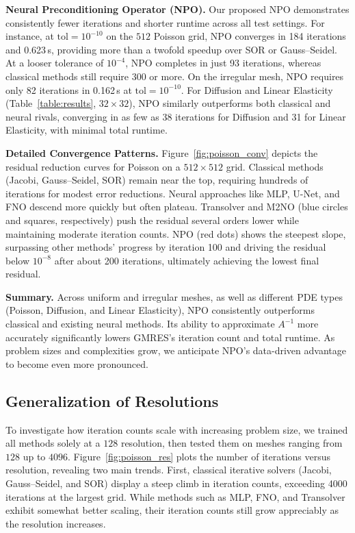 \textbf{Neural Preconditioning Operator (NPO).}
Our proposed NPO demonstrates consistently fewer iterations and shorter runtime across all test settings. For instance, at \(\mathrm{tol}=10^{-10}\) on the \(512\) Poisson grid, NPO converges in 184 iterations and 0.623\,s, providing more than a twofold speedup over SOR or Gauss--Seidel. At a looser tolerance of \(10^{-4}\), NPO completes in just 93 iterations, whereas classical methods still require 300 or more. On the irregular mesh, NPO requires only 82 iterations in 0.162\,s at \(\mathrm{tol}=10^{-10}\). For Diffusion and Linear Elasticity (Table~\ref{table:results}, \(32\times32\)), NPO similarly outperforms both classical and neural rivals, converging in as few as 38 iterations for Diffusion and 31 for Linear Elasticity, with minimal total runtime.





\textbf{Detailed Convergence Patterns.}
Figure~\ref{fig:poisson_conv} depicts the residual reduction curves for Poisson on a \(512\times512\) grid. Classical methods (Jacobi, Gauss--Seidel, SOR) remain near the top, requiring hundreds of iterations for modest error reductions. Neural approaches like MLP, U-Net, and FNO descend more quickly but often plateau. Transolver and M2NO (blue circles and squares, respectively) push the residual several orders lower while maintaining moderate iteration counts. NPO (red dots) shows the steepest slope, surpassing other methods’ progress by iteration 100 and driving the residual below \(10^{-8}\) after about 200 iterations, ultimately achieving the lowest final residual.

\textbf{Summary.}
Across uniform and irregular meshes, as well as different PDE types (Poisson, Diffusion, and Linear Elasticity), NPO consistently outperforms classical and existing neural methods. Its ability to approximate \(A^{-1}\) more accurately significantly lowers GMRES’s iteration count and total runtime. As problem sizes and complexities grow, we anticipate NPO’s data-driven advantage to become even more pronounced.


\subsection{Generalization of Resolutions}

To investigate how iteration counts scale with increasing problem size, we trained all methods solely at a $128$ resolution, then tested them on meshes ranging from \(128\) up to \(4096\). Figure~\ref{fig:poisson_res} plots the number of iterations versus resolution, revealing two main trends. First, classical iterative solvers (Jacobi, Gauss--Seidel, and SOR) display a steep climb in iteration counts, exceeding 4000 iterations at the largest grid. While methods such as MLP, FNO, and Transolver exhibit somewhat better scaling, their iteration counts still grow appreciably as the resolution increases.


